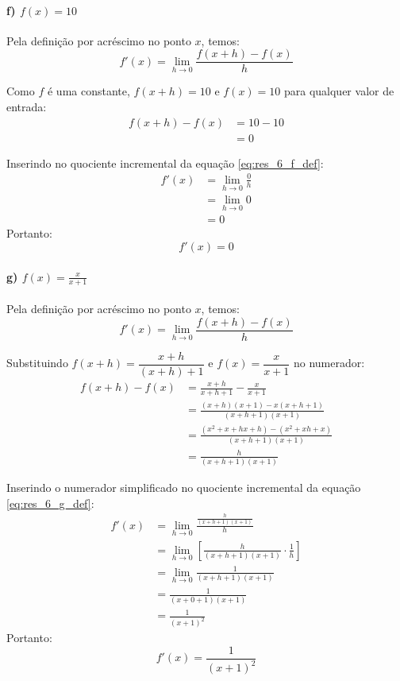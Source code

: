 \setcounter{equation}{0}
\paragraph{f) $f(x) = 10$}

Pela definição por acréscimo no ponto $x$, temos:
\begin{equation}
f'(x) = \lim_{h \to 0} \frac{f(x + h) - f(x)}{h} \label{eq:res_6_f_def}
\end{equation}

Como $f$ é uma constante, $f(x + h) = 10$ e $f(x) = 10$ para qualquer valor de entrada:
\begin{align*}
f(x + h) - f(x) &= 10 - 10 \\
&= 0
\end{align*}

Inserindo no quociente incremental da equação \eqref{eq:res_6_f_def}:
\begin{align*}
f'(x) &= \lim_{h \to 0} \frac{0}{h} \\
      &= \lim_{h \to 0} 0 \\
      &= 0
\end{align*}
Portanto:
\[
  f'(x) = 0
\]

\setcounter{equation}{0}
\paragraph{g) $f(x) = \frac{x}{x + 1}$}

Pela definição por acréscimo no ponto $x$, temos:
\begin{equation}
f'(x) = \lim_{h \to 0} \frac{f(x + h) - f(x)}{h} \label{eq:res_6_g_def}
\end{equation}

Substituindo $f(x + h) = \dfrac{x + h}{(x + h) + 1}$ e $f(x) = \dfrac{x}{x + 1}$ no numerador:
\begin{align*}
f(x + h) - f(x) &= \frac{x + h}{x + h + 1} - \frac{x}{x + 1} \\
&= \frac{(x + h)(x + 1) - x(x + h + 1)}{(x + h + 1)(x + 1)} \\
&= \frac{(x^2 + x + hx + h) - (x^2 + xh + x)}{(x + h + 1)(x + 1)} \\
&= \frac{h}{(x + h + 1)(x + 1)}
\end{align*}

Inserindo o numerador simplificado no quociente incremental da equação \eqref{eq:res_6_g_def}:
\begin{align*}
f'(x) &= \lim_{h \to 0} \frac{\frac{h}{(x + h + 1)(x + 1)}}{h} \\
      &= \lim_{h \to 0} \left[ \frac{h}{(x + h + 1)(x + 1)} \cdot \frac{1}{h} \right] \\
      &= \lim_{h \to 0} \frac{1}{(x + h + 1)(x + 1)} \\
      &= \frac{1}{(x + 0 + 1)(x + 1)} \\
      &= \frac{1}{(x + 1)^2}
\end{align*}
Portanto:
\[
  f'(x) = \frac{1}{(x + 1)^2}
\]

